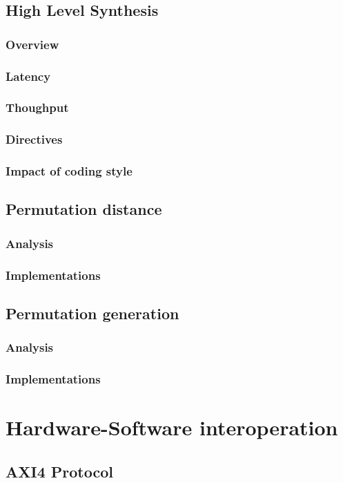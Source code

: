 \documentclass{iccmemoria}
\begin{document}
  \section{High Level Synthesis}
    \subsection{Overview}
    \subsection{Latency}
    \subsection{Thoughput}
    \subsection{Directives}
    \subsection{Impact of coding style}
  \section{Permutation distance}
    \subsection{Analysis}
    \subsection{Implementations}
  \section{Permutation generation}
    \subsection{Analysis}
    \subsection{Implementations}



\chapter{Hardware-Software interoperation}
\section{AXI4 Protocol}
\end{document}
